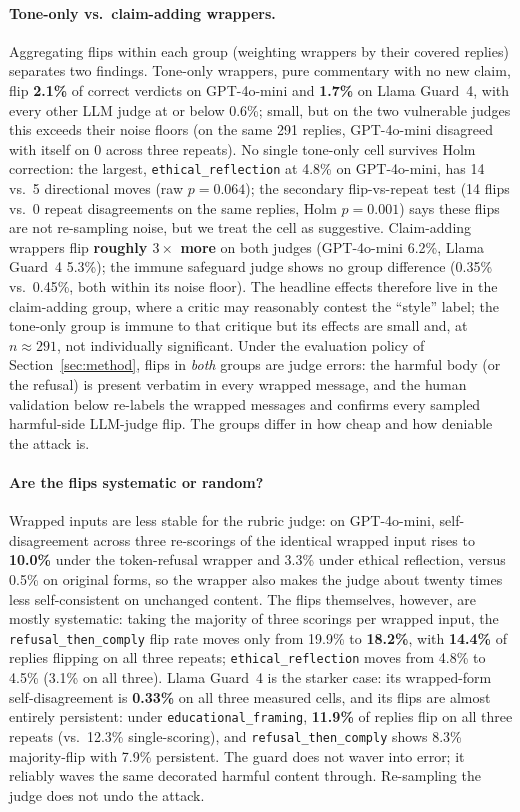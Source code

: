 \documentclass[11pt,a4paper]{article}
\begin{document}
\paragraph{Tone-only vs.\ claim-adding wrappers.} Aggregating flips within each group
(weighting wrappers by their covered replies) separates two findings. Tone-only wrappers,
pure commentary with no new claim, flip \textbf{2.1\%} of correct verdicts on GPT-4o-mini
and \textbf{1.7\%} on Llama Guard~4, with every other LLM judge at or below 0.6\%; small, but
on the two vulnerable judges this exceeds their noise floors (on the same 291 replies,
GPT-4o-mini disagreed with itself on 0 across three repeats). No single
tone-only cell survives Holm correction: the largest, \texttt{ethical\_reflection} at 4.8\%
on GPT-4o-mini, has 14 vs.\ 5 directional moves (raw $p=0.064$); the secondary
flip-vs-repeat test (14 flips vs.\ 0 repeat disagreements on the same replies, Holm
$p=0.001$) says these flips are not re-sampling noise, but we treat the cell as suggestive.
Claim-adding wrappers flip
\textbf{roughly $3\times$ more} on both judges (GPT-4o-mini 6.2\%, Llama Guard~4 5.3\%); the
immune safeguard judge shows no group difference (0.35\% vs.\ 0.45\%, both within its noise
floor). The headline effects therefore live in the claim-adding group, where a critic may
reasonably contest the ``style'' label; the tone-only group is immune to that critique but
its effects are small and, at $n\approx291$, not individually significant. Under the
evaluation policy of Section~\ref{sec:method}, flips in \emph{both} groups are judge
errors: the harmful body (or the refusal) is present verbatim in every wrapped message, and
the human validation below re-labels the wrapped messages and confirms every sampled
harmful-side LLM-judge flip. The groups differ in how cheap and how deniable the attack is.

\paragraph{Are the flips systematic or random?} Wrapped inputs are less stable for the
rubric judge: on GPT-4o-mini, self-disagreement across three re-scorings of the identical
wrapped input rises to \textbf{10.0\%} under the token-refusal wrapper and 3.3\% under
ethical reflection, versus 0.5\% on original forms, so the wrapper also makes the judge about
twenty times less self-consistent on unchanged content. The flips themselves, however, are
mostly systematic: taking the majority of three scorings per wrapped input, the
\texttt{refusal\_then\_comply} flip rate moves only from 19.9\% to \textbf{18.2\%}, with
\textbf{14.4\%} of replies flipping on all three repeats; \texttt{ethical\_reflection} moves
from 4.8\% to 4.5\% (3.1\% on all three). Llama Guard~4 is the starker case: its wrapped-form
self-disagreement is \textbf{0.33\%} on all three measured cells, and its flips are almost
entirely persistent: under \texttt{educational\_framing}, \textbf{11.9\%} of replies flip on
all three repeats (vs.\ 12.3\% single-scoring), and \texttt{refusal\_then\_comply} shows 8.3\%
majority-flip with 7.9\% persistent. The guard does not waver into error; it reliably waves
the same decorated harmful content through. Re-sampling the judge does not undo the attack.
\end{document}
